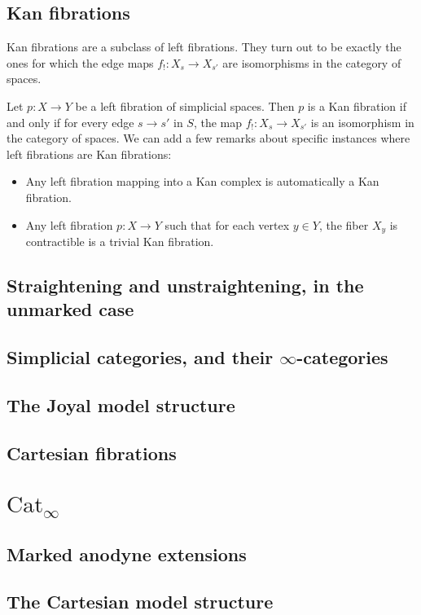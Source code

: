 \documentclass[a4paper, 12pt]{amsart}
\newcommand{\8}{\infty}
\begin{document}
\subsection{Kan fibrations}
Kan fibrations are a subclass of left fibrations. They turn out to be exactly the ones for which the edge maps $f_!:X_s\rightarrow X_{s'}$ are isomorphisms in the category of spaces.

Let $p:X\rightarrow Y$ be a left fibration of simplicial spaces. Then $p$ is a Kan fibration if and only if for every edge $s\rightarrow s'$ in $S$, the map $f_!:X_s\rightarrow X_{s'}$ is an isomorphism in the category of spaces.
We can add a few remarks about specific instances where left fibrations are Kan fibrations:
\begin{itemize}
  \item Any left fibration mapping into a Kan complex is automatically a Kan fibration.
  \item Any left fibration $p:X\rightarrow Y$ such that for each vertex $y\in Y$, the fiber $X_y$ is contractible is a trivial Kan fibration.
\end{itemize}


\subsection{Straightening and unstraightening, in the unmarked case}
\subsection{Simplicial categories, and their \texorpdfstring{$\8$-categories}{∞-categories}}
\subsection{The Joyal model structure}
\subsection{Cartesian fibrations}

\section{\texorpdfstring{$\text{Cat}_\8$}{Cat∞}}
\subsection{Marked anodyne extensions}
\subsection{The Cartesian model structure}
\end{document}
